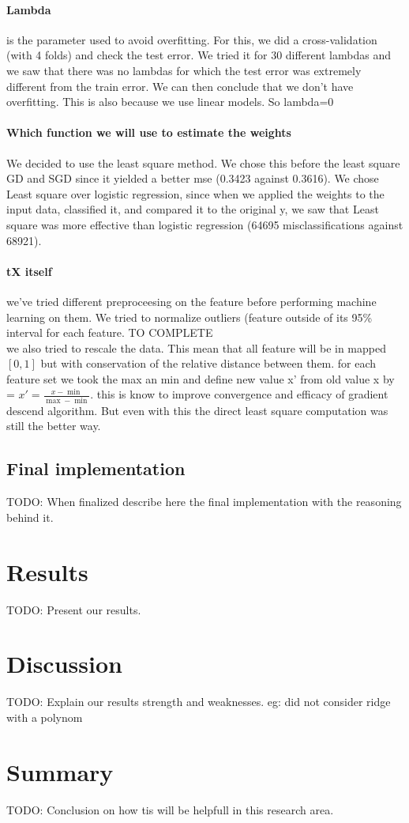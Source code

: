\documentclass[10pt,conference,compsocconf]{IEEEtran}
\begin{document}
\paragraph{Lambda} is the parameter used to avoid overfitting. For this, we did a cross-validation (with 4 folds) and check the test error. We tried it for 30 different lambdas and we saw that there was no lambdas for which the test error was extremely different from the train error. We can then conclude that we don’t have overfitting. This is also because we use linear models. So lambda=0
\paragraph{Which function we will use to estimate the weights} We decided to use the least square method. We chose this before the least square GD and SGD since it yielded a better mse (0.3423 against 0.3616). We chose Least square over logistic regression, since when we applied the weights to the input data, classified it, and compared it to the original y, we saw that Least square was more effective than logistic regression (64695 misclassifications against 68921).
\paragraph{tX itself} we've tried different preproceesing on the feature before performing machine learning on them. We tried to normalize outliers (feature outside of its 95\%  interval for each feature. TO COMPLETE\\
we also tried to rescale the data. This mean that all feature will be in mapped \( [0,1] \) but with conservation of the relative distance between them. for each feature set we took the max an min and define new value x' from old value x by = \( x' = \frac{x-\min}{\max - \min }\). this is know to improve convergence and efficacy of gradient descend algorithm. But even with this the direct least square computation was still the better way.
\subsection{Final implementation}

TODO: When finalized describe here the final implementation with the reasoning behind it.

\section{Results}
TODO: Present our results.

\section{Discussion}
TODO: Explain our results strength and weaknesses.
eg: did not consider ridge with a polynom

\section{Summary}
TODO: Conclusion on how tis will be helpfull in this research area.



\end{document}
